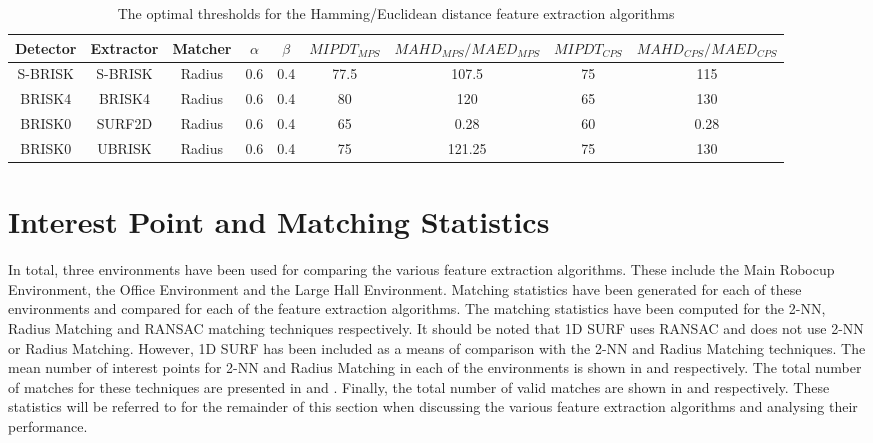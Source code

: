 \documentclass{report}
\begin{document}
\begin{table}
\caption{The optimal thresholds for the Hamming/Euclidean distance feature extraction algorithms}
\footnotesize
\begin{tabular}{|c|c|c|c|c|c|c|c|c|}
\hline 
Detector & Extractor & Matcher & $\alpha$ & $\beta$ & $MIPDT_{MPS}$ & $MAHD_{MPS}/MAED_{MPS}$ & $MIPDT_{CPS}$ & $MAHD_{CPS}/MAED_{CPS}$\tabularnewline
\hline 
\hline 
S-BRISK & S-BRISK & Radius & 0.6 & 0.4 & 77.5 & 107.5 & 75 & 115\tabularnewline
\hline 
BRISK4 & BRISK4 & Radius & 0.6 & 0.4 & 80 & 120 & 65 & 130\tabularnewline
\hline 
BRISK0 & SURF2D & Radius & 0.6 & 0.4 & 65 & 0.28 & 60 & 0.28\tabularnewline
\hline 
BRISK0 & UBRISK & Radius & 0.6 & 0.4 & 75 & 121.25 & 75 & 130\tabularnewline
\hline 
\end{tabular}
\label{tab:hammingStatistics}
\end{table}

\section{Interest Point and Matching Statistics}
\label{sec:matchingStats}
In total, three environments have been used for comparing the various feature extraction algorithms. These include the Main Robocup Environment, the Office Environment and the Large Hall Environment. Matching statistics have been generated for each of these environments and compared for each of the feature extraction algorithms. The matching statistics have been computed for the 2-NN, Radius Matching and RANSAC matching techniques respectively. It should be noted that 1D SURF uses RANSAC and does not use 2-NN or Radius Matching. However, 1D SURF has been included as a means of comparison with the 2-NN and Radius Matching techniques. The mean number of interest points for 2-NN and Radius Matching in each of the environments is shown in  and  respectively. The total number of matches for these techniques are presented in  and . Finally, the total number of valid matches are shown in  and  respectively. These statistics will be referred to for the remainder of this section when discussing the various feature extraction algorithms and analysing their performance.\\
\end{document}
